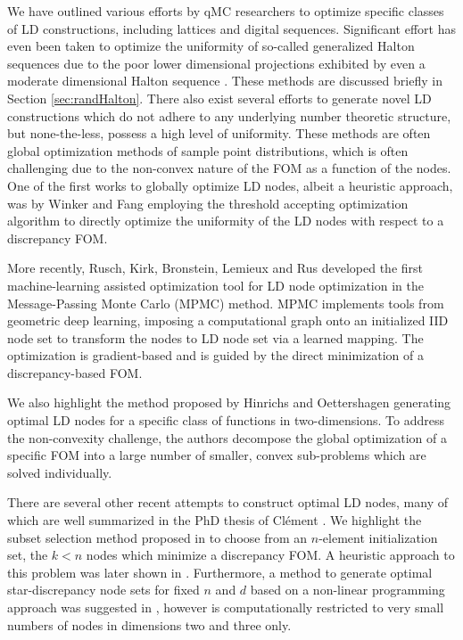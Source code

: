 \documentclass{svproc}
\newcounter{algorithm}%
\begin{document}
We have outlined various efforts by qMC researchers to optimize specific classes of LD constructions, including lattices and digital sequences. Significant effort has even been taken to optimize the uniformity of so-called generalized Halton sequences due to the poor lower dimensional projections exhibited by even a moderate dimensional Halton sequence \cite{faulem09,kirklem24}. These methods are discussed briefly in Section \ref{sec:randHalton}. There also exist several efforts to generate novel LD constructions which do not adhere to any underlying number theoretic structure, but none-the-less, possess a high level of uniformity. These methods are often global optimization methods of sample point distributions, which is often challenging due to the non-convex nature of the FOM as a function of the nodes. 
One of the first works to globally optimize LD nodes, albeit a heuristic approach, was by Winker and Fang \cite{WinFan97b} employing the threshold accepting optimization algorithm to directly optimize the uniformity of the LD nodes with respect to a discrepancy FOM. 

More recently, Rusch, Kirk, Bronstein, Lemieux and Rus \cite{ruschkirk24} developed the first machine-learning assisted optimization tool for LD node optimization in the Message-Passing Monte Carlo (MPMC) method. MPMC implements tools from geometric deep learning, imposing a computational graph onto an initialized IID node set to transform the nodes to LD node set via a learned mapping. The optimization is gradient-based and is guided by the direct minimization of a discrepancy-based FOM. 

We also highlight the method proposed by Hinrichs and Oettershagen \cite{hinoet16} generating optimal LD nodes for a specific class of functions in two-dimensions. To address the non-convexity challenge, the authors decompose the global optimization of a specific FOM into a large number of smaller, convex sub-problems which are solved individually. 

There are several other recent attempts to construct optimal LD nodes, many of which are well summarized in the PhD thesis of Cl\'{e}ment \cite{clethesis24}. We highlight the subset selection method proposed in \cite{cle22} to choose from an $n$-element initialization set, the $k<n$ nodes which minimize a discrepancy FOM. A heuristic approach to this problem was later shown in \cite{cle24_heuristic}. Furthermore, a method to generate optimal star-discrepancy node sets for fixed $n$ and $d$ based on a non-linear programming approach was suggested in \cite{cle24}, however is computationally restricted to very small numbers of nodes in dimensions two and three only.
\end{document}
